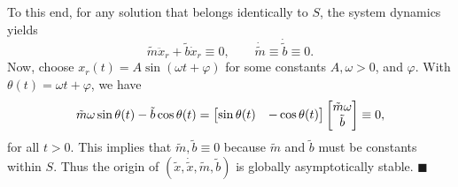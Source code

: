 To this end, for any solution that belongs identically to $S$, the system
dynamics yields \[ \tilde{m}\ddot{x}_r + \tilde{b}\dot{x}_r \equiv 0, \qquad
\dot{\tilde{m}} \equiv \dot{\tilde{b}} \equiv 0. \] Now,
choose $\boxed{x_r(t) = A\sin{(\omega t + \varphi)}}$ for some constants $A,
\omega > 0$, and $\varphi$. With $\theta(t) = \omega t + \varphi$, we have \[
\tilde{m}\omega\sin{\theta(t)} - \tilde{b}\cos{\theta(t)} = \begin{bmatrix}\sin{\theta(t)} &
-\cos{\theta(t)}\end{bmatrix}\begin{bmatrix}\tilde{m}\omega \\ \tilde{b}\end{bmatrix} \equiv 0, \] for all $t > 0$.
This implies that $\tilde{m}, \tilde{b} \equiv 0$ because $\tilde{m}$ and
$\tilde{b}$ must be constants within $S$. Thus the origin of $(\tilde{x},
\dot{\tilde{x}}, \tilde{m}, \tilde{b})$ is globally asymptotically stable.
\hfill $\blacksquare$
